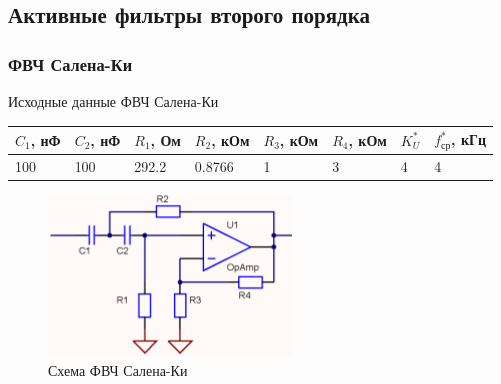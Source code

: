 \documentclass[a4paper, 12pt]{article}
\begin{document}
    \subsection{Активные фильтры второго порядка}
    \subsubsection{ФВЧ Салена-Ки}
    Исходные данные ФВЧ Салена-Ки
    \begin{center}
        \begin{tabular}{ | m{3.5em} | m{3.5em}| m{3.5em} | m{4em} | m{4em} | m{4em} | m{2.5em} | m{3.5em} |} 
        \hline
        $C_1$, нФ&$C_2$, нФ&$R_1$, Ом&$R_2$, кОм&$R_3$, кОм&$R_4$, кОм&$K_U^*$&$f_\text{ср}^*$, кГц\\ 
        \hline
        100&100&292.2&0.8766&1&3&4&4\\ 
        \hline
        \end{tabular}
    \end{center}
    \begin{figure}[H]
        \centering
        \includegraphics{high_pass_sk.png}
        \captionsetup{skip=0pt}
        \caption{Схема ФВЧ Салена-Ки}
        \label{fig:null_scheme3}
    \end{figure}
\end{document}
